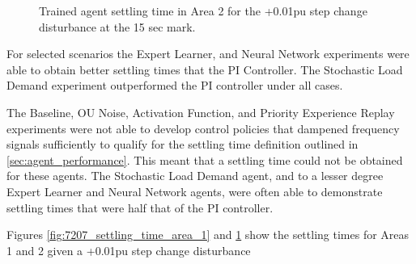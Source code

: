 \begin{figure}[h]
	\begin{minipage}[t]{0.50\textwidth}
		\centering
		\resizebox{7cm}{!}{}
		\caption{Trained agent settling time in Area 1 for the +0.01pu step change disturbance at the 15 sec mark.}\label{fig:7207_settling_time_area_1}
	\end{minipage}
	\hspace{0.25cm}
	\begin{minipage}[t]{0.50\textwidth}
		\resizebox{7cm}{!}{}
		\caption{Trained agent settling time in Area 2 for the +0.01pu step change disturbance at the 15 sec mark.}\label{fig:7208_settling_time_area_2}
	\end{minipage}
\end{figure}

For selected scenarios the Expert Learner, and Neural Network experiments were able to obtain better settling times that the PI Controller. The Stochastic Load Demand experiment outperformed the PI controller under all cases.

The Baseline, OU Noise, Activation Function, and Priority Experience Replay experiments were not able to develop control policies that dampened frequency signals sufficiently to qualify for the settling time definition outlined in \textsection \ref{sec:agent_performance}. This meant that a settling time could not be obtained for these agents. The Stochastic Load Demand agent, and to a lesser degree Expert Learner and Neural Network agents, were often able to demonstrate settling times that were half that of the PI controller.

Figures \ref{fig:7207_settling_time_area_1} and \ref{fig:7208_settling_time_area_2} show the settling times for Areas 1 and 2 given a +0.01pu step change disturbance 
